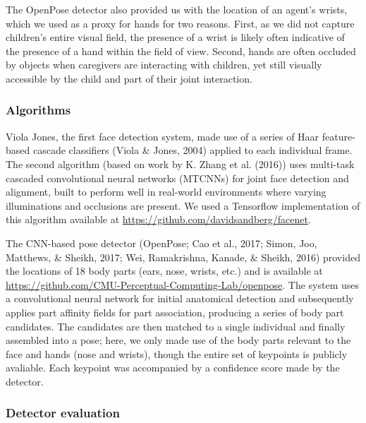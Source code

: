 \documentclass[english,man]{apa6}
\begin{document}
The OpenPose detector also provided us with the location of an agent's
wrists, which we used as a proxy for hands for two reasons. First, as we
did not capture children's entire visual field, the presence of a wrist
is likely often indicative of the presence of a hand within the field of
view. Second, hands are often occluded by objects when caregivers are
interacting with children, yet still visually accessible by the child
and part of their joint interaction.

\subsubsection{Algorithms}\label{algorithms}

Viola Jones, the first face detection system, made use of a series of
Haar feature-based cascade classifiers (Viola \& Jones, 2004) applied to
each individual frame. The second algorithm (based on work by K. Zhang
et al. (2016)) uses multi-task cascaded convolutional neural networks
(MTCNNs) for joint face detection and alignment, built to perform well
in real-world environments where varying illuminations and occlusions
are present. We used a Tensorflow implementation of this algorithm
available at \url{https://github.com/davidsandberg/facenet}.

The CNN-based pose detector (OpenPose; Cao et al., 2017; Simon, Joo,
Matthews, \& Sheikh, 2017; Wei, Ramakrishna, Kanade, \& Sheikh, 2016)
provided the locations of 18 body parts (ears, nose, wrists, etc.) and
is available at
\url{https://github.com/CMU-Perceptual-Computing-Lab/openpose}. The
system uses a convolutional neural network for initial anatomical
detection and subsequently applies part affinity fields for part
association, producing a series of body part candidates. The candidates
are then matched to a single individual and finally assembled into a
pose; here, we only made use of the body parts relevant to the face and
hands (nose and wrists), though the entire set of keypoints is publicly
avaliable. Each keypoint was accompanied by a confidence score made by
the detector.

\subsubsection{Detector evaluation}\label{detector-evaluation}
\end{document}
